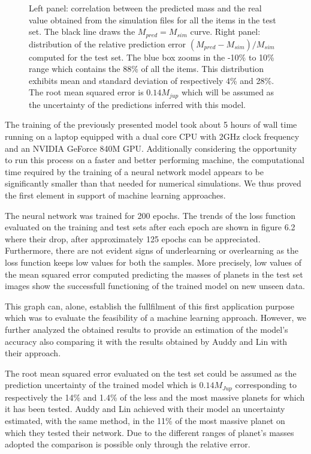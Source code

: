 \documentclass[a4paper,10pt]{report}
\begin{document}
\begin{figure}
    \begin{center}
        \scalebox{0.85}{}
    \end{center}
    \caption{Left panel: correlation between the predicted mass and the real value obtained from the simulation files
    for all the items in the test set. The black line draws the $M_{pred} = M_{sim}$ curve.
    Right panel: distribution of the relative prediction error $(M_{pred} - M_{sim})/M_{sim}$ 
        computed for the test set. The blue box 
    zooms in the -10\% to 10\% range which contains the 88\% of all the items. This distribution exhibits mean and standard 
    deviation of respectively 4\% and 28\%. The root mean squared error is $0.14 M_{jup}$ which will be assumed
    as the uncertainty of the predictions inferred with this model.}
\end{figure}

The training of the previously presented model took about 5 hours of wall time running on a laptop equipped with a dual core CPU
with 2GHz clock frequency and an NVIDIA GeForce 840M GPU. Additionally considering the opportunity to run
this process on a faster and better performing machine, the computational time required by the training of a neural network
model appears to be significantly smaller than that needed for numerical simulations. We thus proved the
first element in support of machine learning approaches.

The neural network was trained for 200 epochs. The trends of the loss function evaluated on the training and test sets after each epoch are shown
in figure 6.2 where their drop, after approximately 125 epochs can be appreciated.
Furthermore, there are not evident signs of underlearning or overlearning as the loss function keeps low values for both the samples.
More precisely, low values of the mean squared error computed predicting the masses of planets in the test set images 
show the successfull functioning of the trained model on new unseen data.

This graph can, alone, establish the fullfilment of this first application purpose which was to evaluate the feasibility of
a machine learning approach. However, we further analyzed the obtained results to provide 
an estimation of the model's accuracy also comparing it with the results obtained by Auddy and Lin with their
approach. 

The root mean squared error evaluated on the test set could be assumed as the
prediction uncertainty of the trained model which is $0.14 M_{Jup}$ corresponding to respectively
the 14\% and 1.4\% of the less and the most massive planets
for which it has been tested. Auddy and Lin achieved with their model an uncertainty estimated, with the same method,
in the 11\% 
of the most massive planet on which they tested their network. 
Due to the different ranges of planet's masses adopted the comparison is possible only through the relative error.
\end{document}
